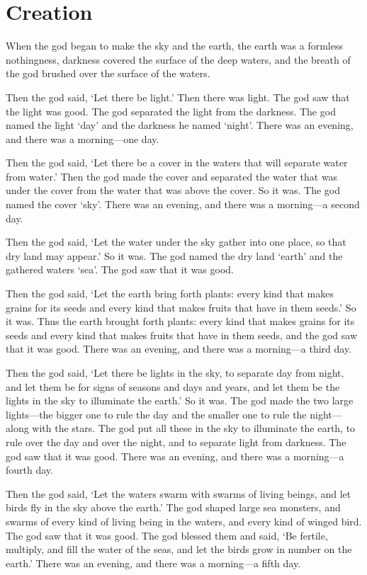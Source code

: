 \chapter{Creation}

When the god began to make the sky and the earth, 
the earth was a formless nothingness, 
darkness covered the surface of the deep waters,
and the breath of the god brushed over the surface of the waters. 

Then the god said, 
`Let there be light.'
Then there was light. 
The god saw that the light was good. 
The god separated the light from the darkness. 
The god named the light `day' and the darkness he named `night'. 
There was an evening, and there was a morning---one day.

Then the god said, 
`Let there be a cover in the waters that will separate water from water.'
Then the god made the cover and separated the water that was under the cover from the water that was above the cover. 
So it was. 
The god named the cover `sky'. 
There was an evening, and there was a morning---a second day.

Then the god said, 
`Let the water under the sky gather into one place, so that dry land may appear.' 
So it was. 
The god named the dry land `earth' and the gathered waters `sea'. 
The god saw that it was good. 

Then the god said, 
`Let the earth bring forth plants: 
every kind that makes grains for its seeds and 
every kind that makes fruits that have in them seeds.'
So it was. 
Thus the earth brought forth plants: 
every kind that makes grains for its seeds and 
every kind that makes fruits that have in them seeds, 
and the god saw that it was good. 
There was an evening, and there was a morning---a third day.

Then the god said, 
`Let there be lights in the sky, 
to separate day from night, and 
let them be for signs of seasons and days and years, 
and let them be the lights in the sky to illuminate the earth.' 
So it was. 
The god made the two large lights---the bigger one to rule the day 
and the smaller one to rule the night---along with the stars. 
The god put all these in the sky to illuminate the earth, 
to rule over the day and over the night, 
and to separate light from darkness. The god saw that it was good.
There was an evening, and there was a morning---a fourth day.

Then the god said, 
`Let the waters swarm with swarms of living beings, 
and let birds fly in the sky above the earth.' 
The god shaped large sea monsters,
and swarms of every kind of living being in the waters,
and every kind of winged bird. 
The god saw that it was good. 
The god blessed them and said, 
`Be fertile, multiply, and fill the water of the seas, 
and let the birds grow in number on the earth.' 
There was an evening, and there was a morning---a fifth day.

